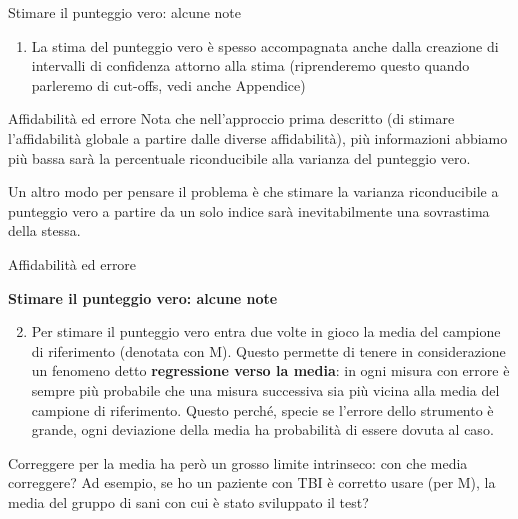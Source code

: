 \documentclass[
  ignorenonframetext,
  aspectratio=169,
]{beamer}
\providecommand{\tightlist}{%
  \setlength{\itemsep}{0pt}\setlength{\parskip}{0pt}}
\begin{document}
\begin{frame}{Stimare il punteggio vero: alcune note}
\label{stimare-il-punteggio-vero-alcune-note}
\begin{enumerate}
[1)]
\tightlist
\item
  La stima del punteggio vero è spesso accompagnata anche dalla
  creazione di intervalli di confidenza attorno alla stima (riprenderemo
  questo quando parleremo di cut-offs, vedi anche Appendice)
\end{enumerate}
\end{frame}

\begin{frame}{Affidabilità ed errore}
\label{affidabilituxe0-ed-errore}
Nota che nell'approccio prima descritto (di stimare l'affidabilità
globale a partire dalle diverse affidabilità), più informazioni abbiamo
più bassa sarà la percentuale riconducibile alla varianza del punteggio
vero.

Un altro modo per pensare il problema è che stimare la varianza
riconducibile a punteggio vero a partire da un solo indice sarà
inevitabilmente una sovrastima della stessa.
\end{frame}

\begin{frame}{Affidabilità ed errore}
\label{affidabilituxe0-ed-errore-1}
\begin{center}
  \textbf{Stimare il punteggio vero: alcune note}
\end{center}

\small

\begin{enumerate}
[1)]
\setcounter{enumi}{1}
\tightlist
\item
  Per stimare il punteggio vero entra due volte in gioco la media del
  campione di riferimento (denotata con M). Questo permette di tenere in
  considerazione un fenomeno detto \textbf{regressione verso la media}:
  in ogni misura con errore è sempre più probabile che una misura
  successiva sia più vicina alla media del campione di riferimento.
  Questo perché, specie se l'errore dello strumento è grande, ogni
  deviazione della media ha probabilità di essere dovuta al caso.
\end{enumerate}

Correggere per la media ha però un grosso limite intrinseco: con che
media correggere? Ad esempio, se ho un paziente con TBI è corretto usare
(per M), la media del gruppo di sani con cui è stato sviluppato il test?
\end{frame}
\end{document}
